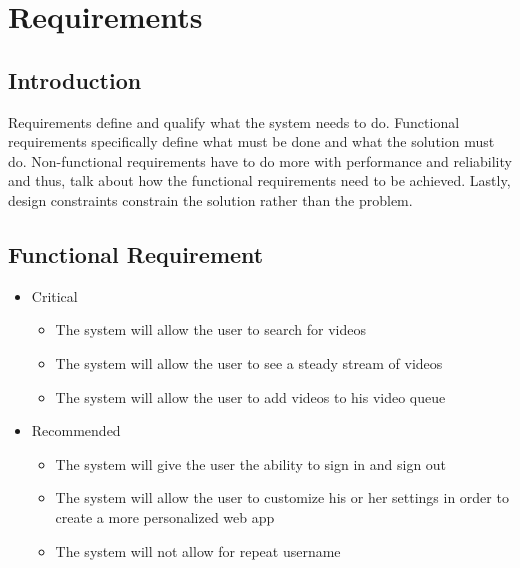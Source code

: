 \chapter{Requirements}

\section{Introduction}
	Requirements define and qualify what the system needs to do. Functional requirements specifically define what must be done and what the solution must do. Non-functional requirements have to do more with performance and reliability and thus, talk about how the functional requirements need to be achieved. Lastly, design constraints constrain the solution rather than the problem.
\section{Functional Requirement}
	\begin{itemize}
    \item Critical
    	\begin{itemize}
        \item The system will allow the user to search for videos
        \item The system will allow the user to see a steady stream of videos
        \item The system will allow the user to add videos to his video queue 
    	\end{itemize}
   	\item Recommended
    	\begin{itemize}
		\item The system will give the user the ability to sign in and sign out 
        \item The system will allow the user to customize his or her settings in order to create a more personalized web app
        \item The system will not allow for repeat username
    	\end{itemize} 
    \end{itemize}
